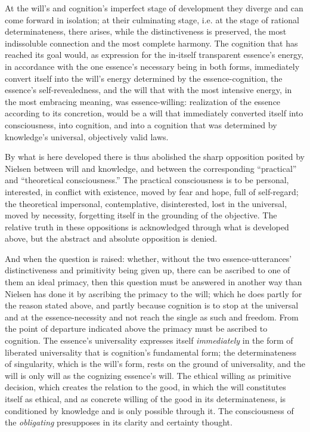 \documentclass[12pt,a4paper]{book}
\begin{document}
At the will's and cognition's imperfect stage of development they diverge and can come forward
in isolation; at their culminating stage, i.e. at the stage of rational determinateness, there
arises, while the distinctiveness is preserved, the most indissoluble connection and the most
complete harmony. The cognition that has reached its goal would, as expression for the in-itself
transparent essence's energy, in accordance with the one essence's necessary being in both
forms, immediately convert itself into the will's energy determined by the essence-cognition,
the essence's self-revealedness, and the will that with the most intensive energy, in the most
embracing meaning, was essence-willing: realization of the essence according to its concretion,
would be a will that immediately converted itself into consciousness, into cognition, and into a
cognition that was determined by knowledge's universal, objectively valid laws.

By what is here developed there is thus abolished the sharp opposition posited by Nielsen between
will and knowledge, and between the corresponding ``practical'' and ``theoretical
consciousness.'' The practical consciousness is to be personal, interested, in conflict with
existence, moved by fear and hope, full of self-regard; the theoretical impersonal, contemplative,
disinterested, lost in the universal, moved by necessity, forgetting itself in the grounding of the
objective. The relative truth in these oppositions is acknowledged through what is developed above,
but the abstract and absolute opposition is denied.

And when the question is raised: whether, without the two essence-utterances' distinctiveness and
primitivity being given up, there can be ascribed to one of them an ideal primacy, then this
question must be answered in another way than Nielsen has done it by ascribing the primacy to the
will; which he does partly for the reason stated above, and partly because cognition is to stop at
the universal and at the essence-necessity and not reach the single as such and freedom. From the
point of departure indicated above the primacy must be ascribed to cognition. The essence's
universality expresses itself \emph{immediately} in the form of liberated universality that is
cognition's fundamental form; the determinateness of singularity, which is the will's form, rests
on the ground of universality, and the will is only will as the cognizing essence's will. The
ethical willing as primitive decision, which creates the relation to the good, in which the will
constitutes itself as ethical, and as concrete willing of the good in its determinateness, is
conditioned by knowledge and is only possible through it. The consciousness of the \emph{obligating} presupposes
in its clarity and certainty thought.
\end{document}
